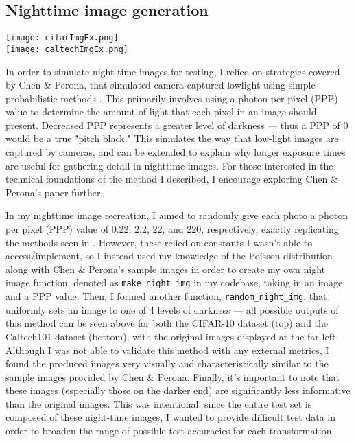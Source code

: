 \documentclass{article}
\begin{document}
\subsection{Nighttime image generation}
\begin{center}
	\texttt{[image: cifarImgEx.png]}\\
	\texttt{[image: caltechImgEx.png]}\\
\end{center}

In order to simulate night-time images for testing, I relied on strategies covered by Chen \& Perona, that simulated camera-captured lowlight using simple probabilistic methods \cite{chenScotopic2015}. This primarily involves using a  photon per pixel (PPP) value to determine the amount of light that each pixel in an image should present. Decreased PPP represents a greater level of darkness --- thus a PPP of 0 would be a true "pitch black." This simulates the way that low-light images are captured by cameras, and can be extended to explain why longer exposure times are useful for gathering detail in nighttime images. For those interested in the technical foundations of the method I described, I encourage exploring Chen \& Perona's paper further. 

In my nighttime image recreation, I aimed to randomly give each photo a photon per pixel (PPP) value of 0.22, 2.2, 22, and 220, respectively, exactly replicating the methods seen in \cite{chenScotopic2015}. However, these relied on constants I wasn't able to access/implement, so I instead used my knowledge of the Poisson distribution along with Chen \& Perona's sample images in order to create my own night image function, denoted as \texttt{make\_night\_img} in my codebase, taking in an image and a PPP value. Then, I formed another function, \texttt{random\_night\_img}, that uniformly sets an image to one of 4 levels of darkness --- all possible outputs of this method can be seen above for both the CIFAR-10 dataset (top) and the Caltech101 dataset (bottom), with the original images displayed at the far left. Although I was not able to validate this method with any external metrics, I found the produced images very visually and characteristically similar to the sample images provided by Chen \& Perona. Finally, it's important to note that these images (especially those on the darker end) are significantly less informative than the original images. This was intentional: since the entire test set is composed of these night-time images, I wanted to provide difficult test data in order to broaden the range of possible test accuracies for each transformation.
\end{document}
